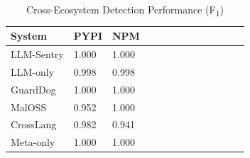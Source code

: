 \begin{table}[t]
\centering
\caption{Cross-Ecosystem Detection Performance (F\textsubscript{1})}
\label{tab:cross_eco}
\small
\begin{tabular}{lllllllllllll}
\toprule
\textbf{System} & \textbf{PYPI} & \textbf{NPM} \\
\midrule
LLM-Sentry & 1.000 & 1.000 \\
LLM-only & 0.998 & 0.998 \\
GuardDog & 1.000 & 1.000 \\
MalOSS & 0.952 & 1.000 \\
CrossLang & 0.982 & 0.941 \\
Meta-only & 1.000 & 1.000 \\
\bottomrule
\end{tabular}
\end{table}